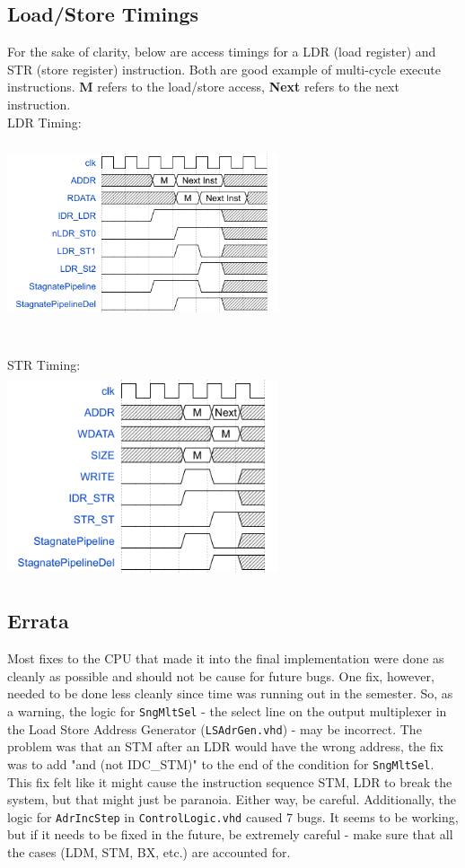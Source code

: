 \documentclass[11pt,a4paper]{article}
\begin{document}
	\subsection{Load/Store Timings}
	For the sake of clarity, below are access timings for a LDR (load register) and STR (store register) instruction. Both are good example of multi-cycle execute instructions. \textbf{M} refers to the load/store access, \textbf{Next} refers to the next instruction.\\
	LDR Timing:\\
	\includegraphics[height=6cm, width=8cm, keepaspectratio=true]{ldr}\\\\
	STR Timing:\\
	\includegraphics[height=6cm, width=8cm, keepaspectratio=true]{str}
	
	
	\subsection{Errata}
	Most fixes to the CPU that made it into the final implementation were done as cleanly as possible and should not be cause for future bugs. One fix, however, needed to be done less cleanly since time was running out in the semester. So, as a warning, the logic for \texttt{SngMltSel} - the select line on the output multiplexer in the Load Store Address Generator (\texttt{LSAdrGen.vhd}) - may be incorrect. The problem was that an STM after an LDR would have the wrong address, the fix was to add "and (not IDC\_STM)" to the end of the condition for \texttt{SngMltSel}. This fix felt like it might cause the instruction sequence STM, LDR to break the system, but that might just be paranoia. Either way, be careful. Additionally, the logic for \texttt{AdrIncStep} in \texttt{ControlLogic.vhd} caused 7 bugs. It seems to be working, but if it needs to be fixed in the future, be extremely careful - make sure that all the cases (LDM, STM, BX, etc.) are accounted for.
	
\end{document}

